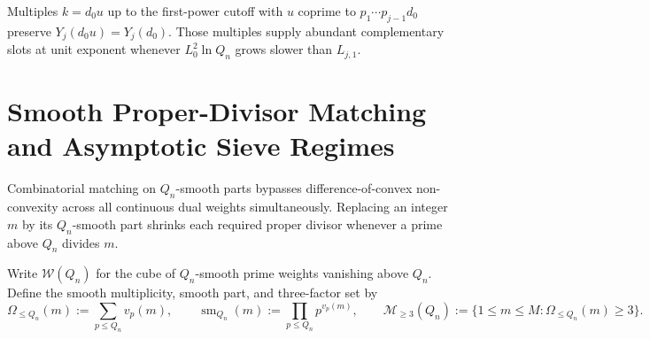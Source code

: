 \documentclass[11pt]{article}
\DeclareMathOperator{\sm}{sm}
\begin{document}
Multiples $k = d_0 u$ up to the first-power cutoff with $u$ coprime to $p_1 \cdots p_{j - 1} d_0$ preserve $Y_j(d_0 u) = Y_j(d_0)$. Those multiples supply abundant complementary slots at unit exponent whenever $L_0^2 \ln Q_n$ grows slower than $L_{j, 1}$.

\section{Smooth Proper-Divisor Matching and Asymptotic Sieve Regimes}

Combinatorial matching on $Q_n$-smooth parts bypasses difference-of-convex non-convexity across all continuous dual weights simultaneously. Replacing an integer $m$ by its $Q_n$-smooth part shrinks each required proper divisor whenever a prime above $Q_n$ divides $m$.

Write $\mathcal{W}(Q_n)$ for the cube of $Q_n$-smooth prime weights vanishing above $Q_n$. Define the smooth multiplicity, smooth part, and three-factor set by
\[
\Omega_{\le Q_n}(m) := \sum_{p \le Q_n} v_p(m), \qquad \sm_{Q_n}(m) := \prod_{p \le Q_n} p^{v_p(m)}, \qquad \mathcal{M}_{\ge 3}(Q_n) := \{1 \le m \le M : \Omega_{\le Q_n}(m) \ge 3\}.
\]
\end{document}
